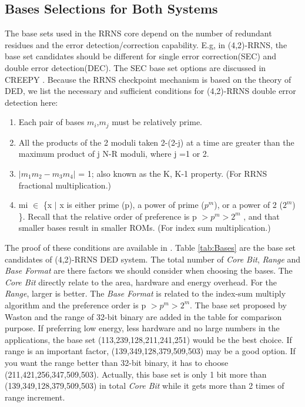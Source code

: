 \documentclass{sig-alternate}
\begin{document}
\subsection{Bases Selections for Both Systems}
\label{sub:RRNS bases}
The base sets used in the RRNS core depend on the number of redundant residues and the error detection/correction capability. E.g, in (4,2)-RRNS, the base set candidates should be different for single error correction(SEC) and double error detection(DEC).  The SEC base set options are discussed in CREEPY \cite{DengTACO18}. Because the RRNS checkpoint mechanism is based on the theory of DED, we list the necessary and sufficient conditions for (4,2)-RRNS double error detection here:
\begin{enumerate}
\item Each pair of bases $m_{i}$,$m_{j}$ must be relatively prime.
\item All the products of the 2 moduli taken 2-(2-j) at a time are greater than the maximum product of j N-R moduli, where j =1 or 2. 
\item $|m_{1}m_{2} - m_{3}m_{4}|$ = 1; also known as the K, K-1 property. (For RRNS fractional multiplication.)
\item mi $\in$ \{x $|$ x is either prime (p), a power of prime ($p^{m}$), or a power of 2 ($2^{m}$) \}. Recall that the relative order of preference is p $> p^{m} > 2^{m}$ , and that smaller bases result in smaller ROMs. (For index sum multiplication.) 
\end{enumerate}

The proof of these conditions are available in \cite{WatsonThesis}. Table \ref{tab:Bases} are the base set candidates of (4,2)-RRNS DED system. The total number of \textit{Core Bit}, \textit{Range} and \textit{Base Format} are there factors we should consider when choosing the bases. The \textit{Core Bit} directly relate to the area, hardware and energy overhead. For the \textit{Range}, larger is better. The \textit{Base Format} is related to the index-sum multiply algorithm \cite{DengTACO18} and the preference order is p $> p^{m} > 2^{m}$. The base set proposed by Waston\cite{WatsonThesis} and the range of 32-bit binary are added in the table for comparison purpose. If preferring low energy, less hardware and no large numbers in the applications, the base set (113,239,128,211,241,251) would be the best choice. If range is an important factor, (139,349,128,379,509,503) may be a good option. If you want the range better than 32-bit binary, it has to choose (211,421,256,347,509,503).  Actually, this base set is only 1 bit more than (139,349,128,379,509,503) in total \textit{Core Bit} while it gets more than 2 times of range increment. 
\end{document}
